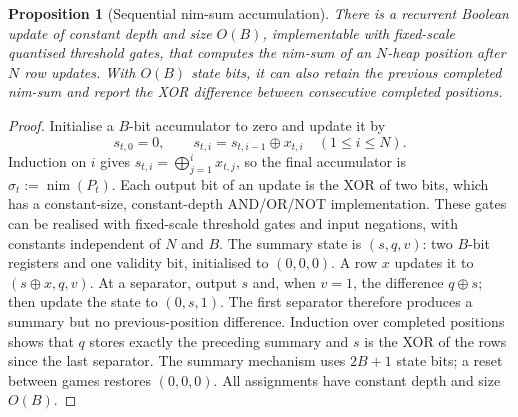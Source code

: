 \documentclass[11pt]{article}
\theoremstyle{plain}
\newtheorem{proposition}[theorem]{Proposition}
\theoremstyle{definition}
\theoremstyle{remark}
\numberwithin{equation}{section}
\begin{document}
\begin{proposition}[Sequential nim-sum accumulation]
\label{prop:streaming-nimsum}
There is a recurrent Boolean update of constant depth and size $O(B)$, implementable with fixed-scale quantised threshold gates, that computes the nim-sum of an $N$-heap position after $N$ row updates. With $O(B)$ state bits, it can also retain the previous completed nim-sum and report the XOR difference between consecutive completed positions.
\end{proposition}
\begin{proof}
Initialise a $B$-bit accumulator to zero and update it by
\[
s_{t,0}=0,\qquad s_{t,i}=s_{t,i-1}\oplus x_{t,i}\quad (1\le i\le N).
\]
Induction on $i$ gives $s_{t,i}=\bigoplus_{j=1}^{i}x_{t,j}$, so the final accumulator is $\sigma_t:=\operatorname{nim}(P_t)$.
Each output bit of an update is the XOR of two bits, which has a constant-size, constant-depth AND/OR/NOT implementation. These gates can be realised with fixed-scale threshold gates and input negations, with constants independent of $N$ and $B$.
The summary state is $(s,q,v)$: two $B$-bit registers and one validity bit, initialised to $(0,0,0)$. A row $x$ updates it to $(s\oplus x,q,v)$. At a separator, output $s$ and, when $v=1$, the difference $q\oplus s$; then update the state to $(0,s,1)$. The first separator therefore produces a summary but no previous-position difference. Induction over completed positions shows that $q$ stores exactly the preceding summary and $s$ is the XOR of the rows since the last separator. The summary mechanism uses $2B+1$ state bits; a reset between games restores $(0,0,0)$. All assignments have constant depth and size $O(B)$.
\end{proof}
\end{document}
